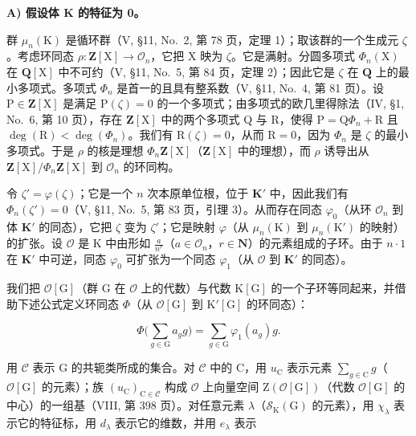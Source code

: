 \textbf{A) 假设体 K 的特征为 0。}

群 \(\mu_n(\mathrm{K})\) 是循环群（V, §11, No.~2, 第 78 页，定理 1）；取该群的一个生成元 \(\zeta\)。考虑环同态 \(\rho: \mathbf{Z}[\mathrm{X}] \to \mathcal{O}_n\)，它把 X 映为 \(\zeta\)。它是满射。分圆多项式 \(\Phi_n(\mathrm{X})\) 在 \(\mathbf{Q}[\mathrm{X}]\) 中不可约（V, §11, No.~5, 第 84 页，定理 2）；因此它是 \(\zeta\) 在 \(\mathbf{Q}\) 上的最小多项式。多项式 \(\Phi_n\) 是首一的且具有整系数（V, §11, No.~4, 第 81 页）。设 \(\mathrm{P} \in \mathbf{Z}[\mathrm{X}]\) 是满足 \(\mathrm{P}(\zeta) = 0\) 的一个多项式；由多项式的欧几里得除法（IV, §1, No.~6, 第 10 页），存在 \(\mathbf{Z}[\mathrm{X}]\) 中的两个多项式 Q 与 R，使得 \(\mathrm{P} = \mathrm{Q}\Phi_n + \mathrm{R}\) 且 \(\deg(\mathrm{R}) < \deg(\Phi_n)\)。我们有 \(\mathrm{R}(\zeta) = 0\)，从而 \(\mathrm{R} = 0\)，因为 \(\Phi_n\) 是 \(\zeta\) 的最小多项式。于是 \(\rho\) 的核是理想 \(\Phi_n\mathbf{Z}[\mathrm{X}]\)（\(\mathbf{Z}[\mathrm{X}]\) 中的理想），而 \(\rho\) 诱导出从 \(\mathbf{Z}[\mathrm{X}] / \Phi_n\mathbf{Z}[\mathrm{X}]\) 到 \(\mathcal{O}_n\) 的环同构。

令 \(\zeta' = \varphi(\zeta)\)；它是一个 \(n\) 次本原单位根，位于 \(\mathbf{K}'\) 中，因此我们有 \(\Phi_n(\zeta') = 0\)（V, §11, No.~5, 第 83 页，引理 3）。从而存在同态 \(\varphi_0\)（从环 \(\mathcal{O}_n\) 到体 \(\mathbf{K}'\) 的同态），它把 \(\zeta\) 变为 \(\zeta'\)；它是映射 \(\varphi\)（从 \(\mu_n(\mathrm{K})\) 到 \(\mu_n(\mathrm{K}')\) 的映射）的扩张。设 \(\mathcal{O}\) 是 \(\mathrm{K}\) 中由形如 \(\frac{a}{n^r}\)（\(a \in \mathcal{O}_n\)，\(r \in \mathbf{N}\)）的元素组成的子环。由于 \(n \cdot 1\) 在 \(\mathbf{K}'\) 中可逆，同态 \(\varphi_0\) 可扩张为一个同态 \(\varphi_1\)（从 \(\mathcal{O}\) 到 \(\mathbf{K}'\) 的同态）。

我们把 \(\mathcal{O}[\mathrm{G}]\)（群 \(\mathrm{G}\) 在 \(\mathcal{O}\) 上的代数）与代数 \(\mathrm{K}[\mathrm{G}]\) 的一个子环等同起来，并借助下述公式定义环同态 \(\Phi\)（从 \(\mathcal{O}[\mathrm{G}]\) 到 \(\mathrm{K}'[\mathrm{G}]\) 的环同态）：

\[
\Phi \bigg (\sum_ {g \in \mathrm{G}} a _ {g} g \bigg) = \sum_ {g \in \mathrm{G}} \varphi_ {1} (a _ {g}) g.\tag{42}
\]

用 \(\mathcal{C}\) 表示 G 的共轭类所成的集合。对 \(\mathcal{C}\) 中的 C，用 \(u_{\mathrm{C}}\) 表示元素 \(\sum_{g\in \mathrm{C}}g\)（\(\mathcal{O}[\mathrm{G}]\) 的元素）；族 \((u_{\mathrm{C}})_{\mathrm{C}\in \mathcal{C}}\) 构成 \(\mathcal{O}\) 上向量空间 \(\mathrm{Z}(\mathcal{O}[\mathrm{G}])\)（代数 \(\mathcal{O}[\mathrm{G}]\) 的中心）的一组基（VIII, 第 398 页）。对任意元素 \(\lambda\)（\(\mathcal{S}_{\mathrm{K}}(\mathrm{G})\) 的元素），用 \(\chi_{\lambda}\) 表示它的特征标，用 \(d_{\lambda}\) 表示它的维数，并用 \(e_{\lambda}\) 表示

